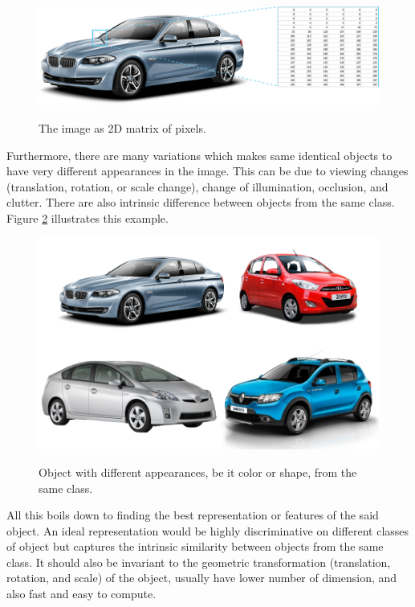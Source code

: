 \documentclass[a4paper,11pt]{kth-mag}
\begin{document}
\begin{figure}[h]
\centering
\includegraphics[scale=0.4]{image/car.png}
\label{fig:car}
\caption{The image as 2D matrix of pixels.}
\end{figure}

Furthermore, there are many variations which makes same identical objects to have very different appearances in the image. This can be due to viewing changes (translation, rotation, or scale change), change of illumination, occlusion, and clutter. There are also intrinsic difference between objects from the same class. Figure \ref{fig:cars} illustrates this example.

\begin{figure}[h]
\centering
\includegraphics[scale=0.4]{image/cars.png}
\label{fig:cars}
\caption{Object with different appearances, be it color or shape, from the same class.}
\end{figure}

All this boils down to finding the best representation or features of the said object. An ideal representation would be highly discriminative on different classes of object but captures the intrinsic similarity between objects from the same class. It should also be invariant to the geometric transformation (translation, rotation, and scale) of the object, usually have lower number of dimension, and also fast and easy to compute.
\end{document}
